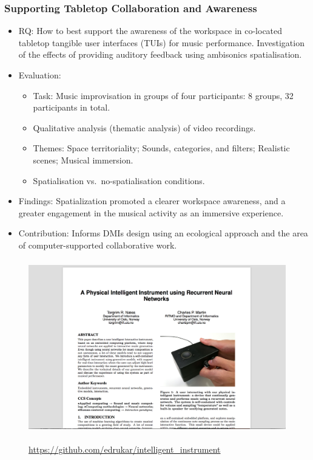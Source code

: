 \documentclass[screen, aspectratio=169]{beamer}
\begin{document}
\begin{frame}
\frametitle{Supporting Tabletop Collaboration and Awareness}	
\begin{itemize}
\item RQ: How to best support the awareness of the workspace in co-located tabletop tangible user interfaces (TUIs) for music performance. Investigation of the effects of providing auditory feedback using ambisonics spatialisation.
\item Evaluation:
\begin{itemize}
\item Task: Music improvisation in groups of four participants: 8 groups, 32 participants in total.
\item Qualitative analysis (thematic analysis) of video recordings.
\item Themes: Space territoriality; Sounds, categories, and filters; Realistic scenes; Musical immersion.
\item Spatialisation vs.\ no-spatialisation conditions.
\end{itemize}
\item Findings: Spatialization promoted a clearer workspace awareness, and a greater engagement in the musical activity as an immersive experience.
\item Contribution: Informs DMIs design using an ecological approach and the area of computer-supported collaborative work.
\end{itemize}
\end{frame}
%
\begin{frame}
\frametitle{}
 \begin{figure}
	\includegraphics[scale=0.31]{img/Torgrim-NIME-2019.png}\\
	    \cite{Naess.2019.NIME}\\
	       {\scriptsize  \url{https://github.com/edrukar/intelligent_instrument}}
   \end{figure}	
\end{frame}
\end{document}
